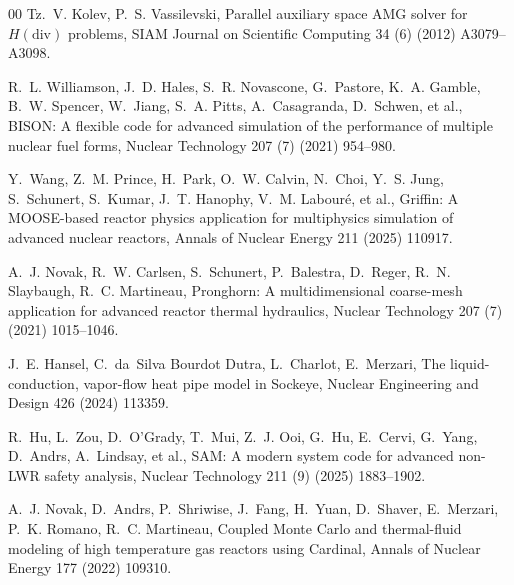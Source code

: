 \documentclass[preprint,12pt, a4paper]{elsarticle}
\begin{document}
\begin{thebibliography}{00}
 Tz.~V. Kolev, P.~S. Vassilevski, Parallel auxiliary space AMG solver for
$H(\mathrm{div})$ problems, SIAM Journal on Scientific Computing 34 (6) (2012) A3079--A3098.

 R.~L. Williamson, J.~D. Hales, S.~R. Novascone, G.~Pastore,
K.~A. Gamble, B.~W. Spencer, W.~Jiang, S.~A. Pitts, A.~Casagranda, D.~Schwen, et al., BISON: A
flexible code for advanced simulation of the performance of multiple nuclear fuel forms, Nuclear
Technology 207 (7) (2021) 954--980.

 Y.~Wang, Z.~M. Prince, H.~Park, O.~W. Calvin, N.~Choi, Y.~S. Jung,
S.~Schunert, S.~Kumar, J.~T. Hanophy, V.~M. Labour\'e, et al., Griffin: A MOOSE-based reactor
physics application for multiphysics simulation of advanced nuclear reactors, Annals of Nuclear
Energy 211 (2025) 110917.

 A.~J. Novak, R.~W. Carlsen, S.~Schunert, P.~Balestra, D.~Reger,
R.~N. Slaybaugh, R.~C. Martineau, Pronghorn: A multidimensional coarse-mesh application for
advanced reactor thermal hydraulics, Nuclear Technology 207 (7) (2021) 1015--1046.

 J.~E. Hansel, C.~da~Silva Bourdot Dutra, L.~Charlot, E.~Merzari, The
liquid-conduction, vapor-flow heat pipe model in Sockeye, Nuclear Engineering and Design 426
(2024) 113359.

 R.~Hu, L.~Zou, D.~O'Grady, T.~Mui, Z.~J. Ooi, G.~Hu, E.~Cervi, G.~Yang,
D.~Andrs, A.~Lindsay, et al., SAM: A modern system code for advanced non-LWR safety analysis,
Nuclear Technology 211 (9) (2025) 1883--1902.

 A.~J. Novak, D.~Andrs, P.~Shriwise, J.~Fang, H.~Yuan, D.~Shaver,
E.~Merzari, P.~K. Romano, R.~C. Martineau, Coupled Monte Carlo and thermal-fluid modeling of high
temperature gas reactors using Cardinal, Annals of Nuclear Energy 177 (2022) 109310.

\end{thebibliography}
\end{document}
